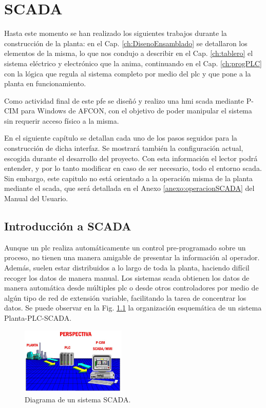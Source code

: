 \chapter{SCADA}
\label{ch:scada}

Hasta este momento se han realizado los siguientes trabajos durante la
construcción de la planta: en el Cap.
\ref{ch:DisenoEnsamblado} se detallaron los elementos de la misma, lo que nos
condujo a describir en el Cap. \ref{ch:tablero} el sistema eléctrico y
electrónico que la anima, continuando en el Cap. \ref{ch:progPLC} con la
lógica que regula al sistema completo por medio del \gls{plc} y que pone a la 
planta en funcionamiento. 

Como actividad final de este \gls{pfe} se diseñó y realizo una \gls{hmi}
\gls{scada} mediante P-CIM para Windows de AFCON, con el objetivo de poder
manipular el sistema sin requerir acceso físico a la misma.

En el siguiente capítulo se detallan cada uno de los pasos seguidos para la 
construcción de dicha interfaz.
Se mostrará también la configuración actual, escogida durante el desarrollo del
proyecto.
Con esta información el lector podrá entender, y por lo
tanto modificar en caso de ser necesario, todo el entorno \gls{scada}. Sin
embargo, este capitulo no está orientado a la operación misma de la planta
mediante el \gls{scada}, que será detallada en el Anexo
\ref{anexo:operacionSCADA} del Manual del Usuario. 

\section{Introducción a SCADA}
\label{sec:IntroScada}
Aunque un \gls{plc} realiza automáticamente un control pre-programado sobre un 
proceso, no tienen una manera amigable de presentar la información al operador.
Además, suelen estar distribuidos a lo largo de toda la planta, haciendo
difícil recoger los datos de manera manual.
Los sistemas \gls{scada} obtienen los datos de manera
automática desde múltiples \gls{plc} o desde otros controladores por medio de 
algún tipo de red de extensión variable, facilitando la tarea de concentrar 
los datos. Se puede observar en la Fig. \ref{fig:perspectivaSCADA} la
organización esquemática de un sistema Planta-PLC-SCADA.
\begin{figure}[ht!]
	\centering
	\includegraphics[width=0.445\textwidth]
	{Cap5-SCADA/images/perspectiva.jpeg}
	\caption{Diagrama de un sistema SCADA.}
	\label{fig:perspectivaSCADA}
\end{figure}

